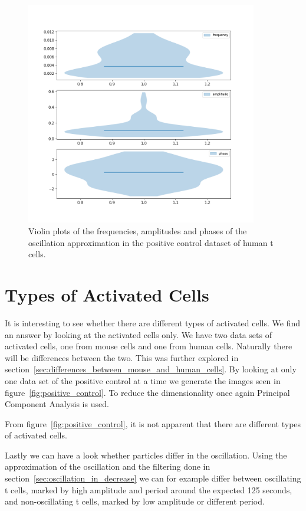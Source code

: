 \begin{figure}[h!]
	\centering
	\includegraphics[width=0.9\textwidth]{fig/freq_amp}
	
	\caption{Violin plots of the frequencies, amplitudes and phases of the oscillation approximation in the positive control dataset of human t cells.}
	\label{fig:freq_amp}
\end{figure}

\newpage
\section{Types of Activated Cells}

It is interesting to see whether there are different types of activated cells. We find an answer by looking at the activated cells only. We have two data sets of activated cells, one from mouse cells and one from human cells. Naturally there will be differences between the two. This was further explored in section~\ref{sec:differences_between_mouse_and_human_cells}. By looking at only one data set of the positive control at a time we generate the images seen in figure~\ref{fig:positive_control}. To reduce the dimensionality once again Principal Component Analysis is used.

From figure~\ref{fig:positive_control}, it is not apparent that there are different types of activated cells.

Lastly we can have a look whether particles differ in the oscillation. Using the approximation of the oscillation and the filtering done in section~\ref{sec:oscillation_in_decrease} we can for example differ between oscillating t cells, marked by high amplitude and period around the expected 125 seconds, and non-oscillating t cells, marked by low amplitude or different period.

